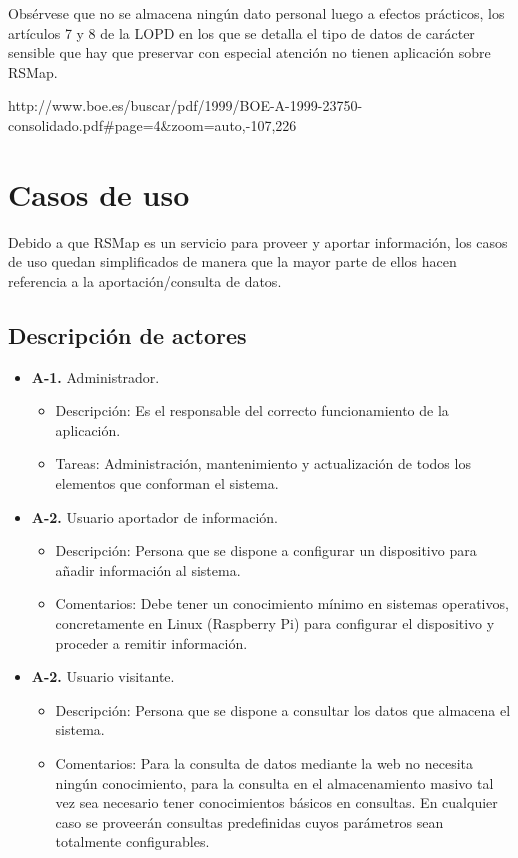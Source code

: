 Obsérvese que no se almacena ningún dato personal luego a efectos prácticos, los artículos 7 y 8 de la LOPD en los que se detalla el tipo de datos de carácter sensible que hay que preservar con especial atención no tienen aplicación sobre RSMap.

http://www.boe.es/buscar/pdf/1999/BOE-A-1999-23750-consolidado.pdf#page=4&zoom=auto,-107,226

\newpage

\section{Casos de uso}

Debido a que RSMap es un servicio para proveer y aportar información, los casos de uso quedan simplificados de manera que la mayor parte de ellos hacen referencia a la aportación/consulta de datos.

\subsection{Descripción de actores}

\begin{itemize}
  \item \textbf{A-1.} Administrador.
  \begin{itemize}
   \item Descripción: Es el responsable del correcto funcionamiento de la aplicación.
   \item Tareas: Administración, mantenimiento y actualización de todos los elementos que conforman el sistema.
  \end{itemize}

  \item \textbf{A-2.} Usuario aportador de información.
  \begin{itemize}
   \item Descripción: Persona que se dispone a configurar un dispositivo para añadir información al sistema.
   \item Comentarios: Debe tener un conocimiento mínimo en sistemas operativos, concretamente en Linux (Raspberry Pi) para configurar el dispositivo y proceder a remitir información.
  \end{itemize}

  \item \textbf{A-2.} Usuario visitante.
  \begin{itemize}
   \item Descripción: Persona que se dispone a consultar los datos que almacena el sistema.
   \item Comentarios: Para la consulta de datos mediante la web no necesita ningún conocimiento, para la consulta en el almacenamiento masivo tal vez sea necesario tener conocimientos básicos en consultas. En cualquier caso se proveerán consultas predefinidas cuyos parámetros sean totalmente configurables.
  \end{itemize}
\end{itemize}

